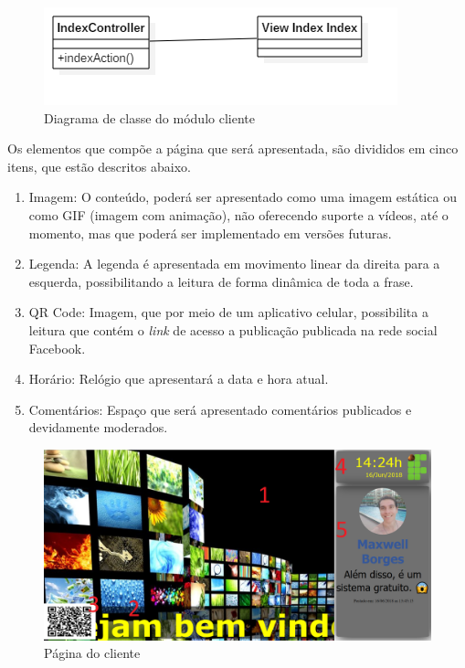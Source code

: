 \begin{figure}[H]
\centering
\includegraphics[scale=0.4]{figuras/diagramaclasseCLIENTE}
\caption{Diagrama de classe do módulo cliente}
\label{fig:diagramaclasseCLIENTE}
\end{figure}

Os elementos que compõe a página que será apresentada, são divididos em cinco itens, que estão descritos abaixo.

\begin{enumerate}
   \item Imagem: O conteúdo, poderá ser apresentado como uma imagem estática ou como GIF (imagem com animação), não oferecendo suporte a vídeos, até o momento, mas que poderá ser implementado em versões futuras. 
   \item Legenda: A legenda é apresentada em movimento linear da direita para a esquerda, possibilitando a leitura de forma dinâmica de toda a frase.
   \item QR Code: Imagem, que por meio de um aplicativo celular, possibilita a leitura que contém o \textit{link} de acesso a publicação publicada na rede social Facebook.
   \item Horário: Relógio que apresentará a data e hora atual.  
   \item Comentários: Espaço que será apresentado comentários publicados e devidamente moderados.
 \end{enumerate}
  
\begin{figure}[H]
\centering
\includegraphics[scale=0.3]{figuras/cliente1}
\caption{Página do cliente}
\label{fig:cliente1}
\end{figure}

